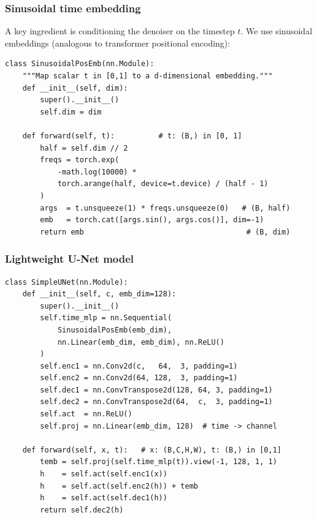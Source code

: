 \documentclass{beamer}
\begin{document}
\begin{frame}
\frametitle{Sinusoidal time embedding}

A key ingredient is conditioning the denoiser on the timestep $t$.
We use sinusoidal embeddings (analogous to transformer positional encoding):

\begin{verbatim}
class SinusoidalPosEmb(nn.Module):
    """Map scalar t in [0,1] to a d-dimensional embedding."""
    def __init__(self, dim):
        super().__init__()
        self.dim = dim

    def forward(self, t):          # t: (B,) in [0, 1]
        half = self.dim // 2
        freqs = torch.exp(
            -math.log(10000) *
            torch.arange(half, device=t.device) / (half - 1)
        )
        args  = t.unsqueeze(1) * freqs.unsqueeze(0)   # (B, half)
        emb   = torch.cat([args.sin(), args.cos()], dim=-1)
        return emb                                     # (B, dim)
\end{verbatim}
\end{frame}

\begin{frame}
\frametitle{Lightweight U-Net model}

\begin{verbatim}
class SimpleUNet(nn.Module):
    def __init__(self, c, emb_dim=128):
        super().__init__()
        self.time_mlp = nn.Sequential(
            SinusoidalPosEmb(emb_dim),
            nn.Linear(emb_dim, emb_dim), nn.ReLU()
        )
        self.enc1 = nn.Conv2d(c,   64,  3, padding=1)
        self.enc2 = nn.Conv2d(64, 128,  3, padding=1)
        self.dec1 = nn.ConvTranspose2d(128, 64, 3, padding=1)
        self.dec2 = nn.ConvTranspose2d(64,  c,  3, padding=1)
        self.act  = nn.ReLU()
        self.proj = nn.Linear(emb_dim, 128)  # time -> channel

    def forward(self, x, t):   # x: (B,C,H,W), t: (B,) in [0,1]
        temb = self.proj(self.time_mlp(t)).view(-1, 128, 1, 1)
        h    = self.act(self.enc1(x))
        h    = self.act(self.enc2(h)) + temb
        h    = self.act(self.dec1(h))
        return self.dec2(h)
\end{verbatim}
\end{frame}
\end{document}
